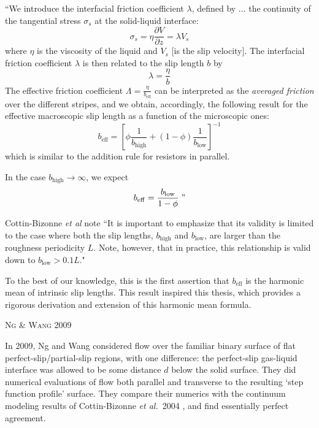 \documentclass[12pt, a4paper, twoside, openright]{book}
\newcommand{\beff}{\ensuremath{b_{\mathrm{eff}}}}
\newcommand{\bhigh}{\ensuremath{b_{\mathrm{high}}}}
\newcommand{\blow}{\ensuremath{b_{\mathrm{low}}}}
\newcommand{\sep}{\begin{equation*} \star \end{equation*}}
\newcommand{\paper}[1]
         {\colorbox[gray]{0.8}{ \textsc{#1}}
         
         }
\begin{document}
``We introduce the interfacial friction coefficient $\lambda$, defined by ... the continuity of the tangential stress $\sigma_s$ at the solid-liquid interface:
\begin{equation}
\sigma_s = \eta \frac{\partial V}{\partial z} = \lambda V_s
\end{equation}
where $\eta$ is the viscosity of the liquid and $V_s$ [is the slip velocity]. The interfacial friction coefficient $\lambda$ is then related to the slip length $b$ by
\begin{equation}
\lambda = \frac{\eta}{b}
\end{equation}
The effective friction coefficient $\Lambda = \frac{\eta}{\beff}$ can be interpreted as the \emph{averaged friction} over the different stripes, and we obtain, accordingly, the following result for the effective macroscopic slip length as a function of the microscopic ones:
\begin{equation}
\beff = \left[ \phi \frac{1}{ b_{\mathrm{high}} }  + (1 -\phi) \frac{1}{ b_{\mathrm{low}}} \right]^{-1}
\end{equation}
which is similar to the addition rule for resistors in parallel.

In the case $b_{\mathrm{high}} \rightarrow \infty$, we expect
\begin{equation}
\beff = \frac{b_{\mathrm{low}}}{1-\phi} \;"
\end{equation}

Cottin-Bizonne \emph{et al} note ``It is important to emphasize that its validity is limited to the case where both the slip lengths, $\bhigh$ and $\blow$, are larger than the roughness periodicity $L$. Note, however, that in practice, this relationship is valid down to $\blow > 0.1L$."

To the best of our knowledge, this is the first assertion that $\beff$ is the harmonic mean of intrinsic slip lengths.  This result inspired this thesis, which provides a rigorous derivation and extension of this harmonic mean formula.

\clearpage

\paper{Ng \& Wang 2009}
In 2009, Ng and Wang \cite{NgWang2009} considered flow over the familiar binary surface of flat perfect-slip/partial-slip regions, with one difference: the perfect-slip gas-liquid interface was allowed to be some distance $d$ below the solid surface.  They did numerical evaluations of flow both parallel and transverse to the resulting `step function profile' surface.
They compare their numerics with the continuum modeling results of Cottin-Bizonne \emph{et al.}\ 2004 \cite{Cottin-Bizonne2004}, and find essentially perfect agreement.
\end{document}
